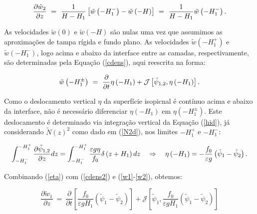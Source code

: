 \begin{equation}
\frac{\partial \tilde{w}_2}{\partial z} \ = \ \frac{1}{H - H_1}\left [ \tilde{w} \left ( -H_1^{-} \right ) - \tilde{w} \left ( -H \right ) \right ] \ = \ \frac{1}{H - H_1} \tilde{w} \left ( -H_1^{-} \right ).
\label{w2}
\vspace{0.5cm}
\end{equation}

As velocidades $\tilde{w} \left ( 0 \right )$ e $\tilde{w} \left ( -H \right )$ são nulas uma vez 
que assumimos as aproximações de tampa rígida e fundo plano. As velocidades 
$\tilde{w} \left ( -H_1^{+} \right )$ e $\tilde{w} \left ( -H_1^{-} \right )$, logo acima e abaixo da 
interface entre as camadas, respectivamente, são determinadas pela Equação (\ref{cdens}), 
aqui reescrita na forma:

\begin{equation}
\tilde{w} \left ( -H_1^{\pm} \right ) \ = \ \frac{\partial}{\partial t} \eta \left ( -H_1 \right ) + \mathcal{J} \left [ \tilde{\psi}_{1,2},\eta \left ( -H_1 \right ) \right ].
\label{cdens2}
\vspace{0.5cm}
\end{equation}

Como o deslocamento vertical $\eta$ da superfície isopicnal é contínuo acima e abaixo da interface, 
não é necessário diferenciar $\eta \left ( -H_1 \right )$ em  $\eta \left ( -H_1^{\pm} \right )$. 
Este deslocamento é determinado via integração vertical da Equação (\ref{hid}), já considerando 
$\tilde{N}(z)^2$ como dado em (\ref{N2d}), nos limites $-H_1^{+}$ e $-H_1^{-}$:

\begin{equation}
\int_{-H_1^{-}}^{-H_1^{+}} \frac{\partial \tilde{\psi}_{1,2}}{\partial z} dz = \int_{-H_1^{-}}^{-H_1^{+}} \frac{\varepsilon g \eta}{f_0} \delta \left ( z + H_1 \right ) dz \quad \Rightarrow \quad \eta \left ( -H_1 \right ) = - \frac{f_0}{\varepsilon g} \left ( \tilde{\psi}_1 - \tilde{\psi}_2 \right ).
\label{eta}
\vspace{0.5cm}
\end{equation}

Combinando (\ref{eta}) com (\ref{cdens2}) e (\ref{w1}-\ref{w2}), obtemos:

\begin{equation}
\frac{\partial \tilde{w}_1}{\partial z} \ = \ \frac{\partial}{\partial t} \left [ \frac{f_0}{\varepsilon g H_1} \left ( \tilde{\psi}_1 - \tilde{\psi}_2 \right ) \right ] + \mathcal{J} \left [ \tilde{\psi}_1, \frac{f_0}{\varepsilon g H_1} \left ( \tilde{\psi}_1 - \tilde{\psi}_2 \right ) \right ]
\label{w1_2}
\end{equation}

